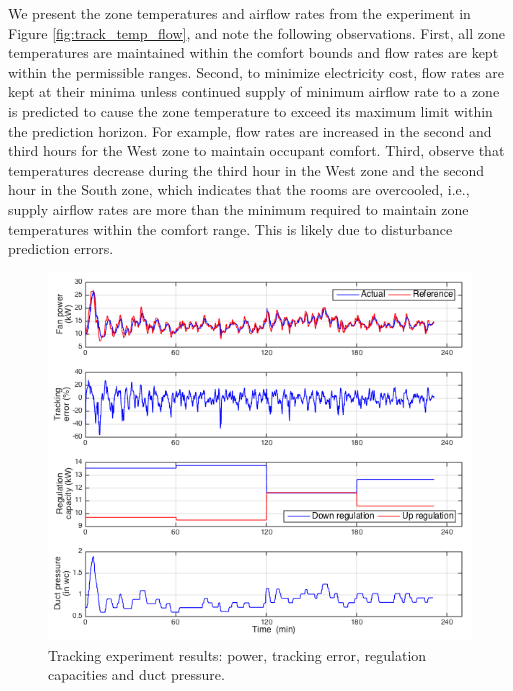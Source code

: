 We present the zone temperatures and airflow rates from the experiment in Figure \ref{fig:track_temp_flow}, and note the following observations. 
First, all zone temperatures are maintained within the comfort bounds and flow rates are kept within the permissible ranges. 
Second, to minimize electricity cost, flow rates are kept at their minima unless continued supply of minimum airflow rate to a zone is predicted to cause the zone temperature to exceed its maximum limit within the prediction horizon. 
For example, flow rates are increased in the second and third hours for the West zone to maintain occupant comfort. 
Third, observe that temperatures decrease during the third hour in the West zone and the second hour in the South zone, which indicates that the rooms are overcooled, i.e., supply airflow rates are more than the minimum required to maintain zone temperatures within the comfort range. 
This is likely due to disturbance prediction errors.


\begin{figure}[t]
\centering
\vspace*{1cm}
\includegraphics[width=\textwidth]{chapters/building_exp/figures/Track_power.png}
\caption{Tracking experiment results: power, tracking error, regulation capacities and duct pressure.}
\label{fig:track_power}
\end{figure}

